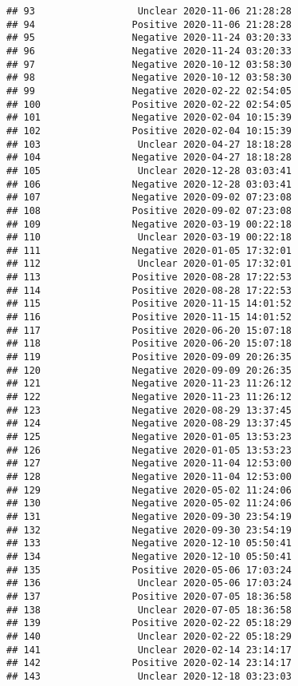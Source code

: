 \documentclass[
]{article}
\begin{document}
\begin{verbatim}
## 93                  Unclear 2020-11-06 21:28:28
## 94                 Positive 2020-11-06 21:28:28
## 95                 Negative 2020-11-24 03:20:33
## 96                 Negative 2020-11-24 03:20:33
## 97                 Negative 2020-10-12 03:58:30
## 98                 Negative 2020-10-12 03:58:30
## 99                 Negative 2020-02-22 02:54:05
## 100                Positive 2020-02-22 02:54:05
## 101                Negative 2020-02-04 10:15:39
## 102                Positive 2020-02-04 10:15:39
## 103                 Unclear 2020-04-27 18:18:28
## 104                Negative 2020-04-27 18:18:28
## 105                 Unclear 2020-12-28 03:03:41
## 106                Negative 2020-12-28 03:03:41
## 107                Negative 2020-09-02 07:23:08
## 108                Positive 2020-09-02 07:23:08
## 109                Negative 2020-03-19 00:22:18
## 110                 Unclear 2020-03-19 00:22:18
## 111                Negative 2020-01-05 17:32:01
## 112                 Unclear 2020-01-05 17:32:01
## 113                Positive 2020-08-28 17:22:53
## 114                Positive 2020-08-28 17:22:53
## 115                Positive 2020-11-15 14:01:52
## 116                Positive 2020-11-15 14:01:52
## 117                Positive 2020-06-20 15:07:18
## 118                Positive 2020-06-20 15:07:18
## 119                Positive 2020-09-09 20:26:35
## 120                Negative 2020-09-09 20:26:35
## 121                Negative 2020-11-23 11:26:12
## 122                Negative 2020-11-23 11:26:12
## 123                Negative 2020-08-29 13:37:45
## 124                Negative 2020-08-29 13:37:45
## 125                Negative 2020-01-05 13:53:23
## 126                Negative 2020-01-05 13:53:23
## 127                Negative 2020-11-04 12:53:00
## 128                Negative 2020-11-04 12:53:00
## 129                Negative 2020-05-02 11:24:06
## 130                Negative 2020-05-02 11:24:06
## 131                Negative 2020-09-30 23:54:19
## 132                Negative 2020-09-30 23:54:19
## 133                Negative 2020-12-10 05:50:41
## 134                Negative 2020-12-10 05:50:41
## 135                Positive 2020-05-06 17:03:24
## 136                 Unclear 2020-05-06 17:03:24
## 137                Positive 2020-07-05 18:36:58
## 138                 Unclear 2020-07-05 18:36:58
## 139                Positive 2020-02-22 05:18:29
## 140                 Unclear 2020-02-22 05:18:29
## 141                 Unclear 2020-02-14 23:14:17
## 142                Positive 2020-02-14 23:14:17
## 143                 Unclear 2020-12-18 03:23:03

\end{verbatim}
\end{document}
